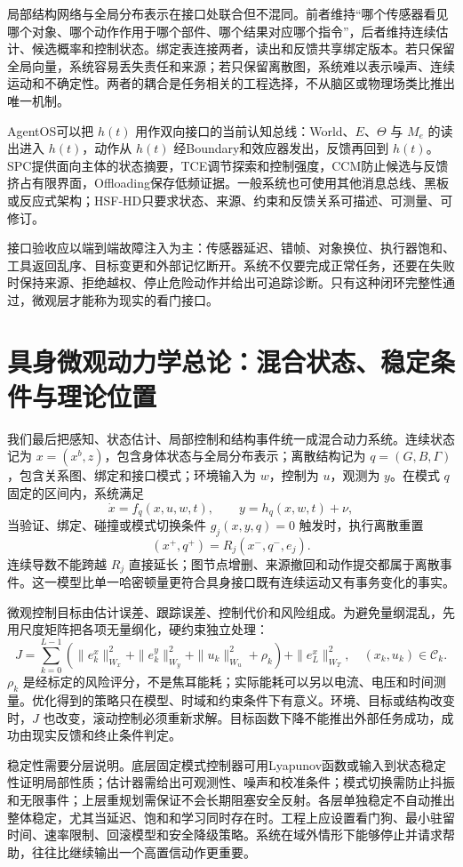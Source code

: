 局部结构网络与全局分布表示在接口处联合但不混同。前者维持“哪个传感器看见哪个对象、哪个动作作用于哪个部件、哪个结果对应哪个指令”，后者维持连续估计、候选概率和控制状态。绑定表连接两者，读出和反馈共享绑定版本。若只保留全局向量，系统容易丢失责任和来源；若只保留离散图，系统难以表示噪声、连续运动和不确定性。两者的耦合是任务相关的工程选择，不从脑区或物理场类比推出唯一机制。

AgentOS可以把 $h(t)$ 用作双向接口的当前认知总线：World、$E$、$\Theta$ 与 $M_e$ 的读出进入 $h(t)$，动作从 $h(t)$ 经Boundary和效应器发出，反馈再回到 $h(t)$。SPC提供面向主体的状态摘要，TCE调节探索和控制强度，CCM防止候选与反馈挤占有限界面，Offloading保存低频证据。一般系统也可使用其他消息总线、黑板或反应式架构；HSF-HD只要求状态、来源、约束和反馈关系可描述、可测量、可修订。

接口验收应以端到端故障注入为主：传感器延迟、错帧、对象换位、执行器饱和、工具返回乱序、目标变更和外部记忆断开。系统不仅要完成正常任务，还要在失败时保持来源、拒绝越权、停止危险动作并给出可追踪诊断。只有这种闭环完整性通过，微观层才能称为现实的看门接口。

\section{具身微观动力学总论：混合状态、稳定条件与理论位置}
\label{sec:section_5750}

我们最后把感知、状态估计、局部控制和结构事件统一成混合动力系统。连续状态记为 $x=(x^b,z)$，包含身体状态与全局分布表示；离散结构记为 $q=(G,B,\Gamma)$，包含关系图、绑定和接口模式；环境输入为 $w$，控制为 $u$，观测为 $y$。在模式 $q$ 固定的区间内，系统满足
\[
\dot x=f_q(x,u,w,t),\qquad y=h_q(x,w,t)+\nu,
\]
当验证、绑定、碰撞或模式切换条件 $g_j(x,y,q)=0$ 触发时，执行离散重置
\[
(x^+,q^+)=R_j(x^-,q^-,e_j).
\]
连续导数不能跨越 $R_j$ 直接延长；图节点增删、来源撤回和动作提交都属于离散事件。这一模型比单一哈密顿量更符合具身接口既有连续运动又有事务变化的事实。

微观控制目标由估计误差、跟踪误差、控制代价和风险组成。为避免量纲混乱，先用尺度矩阵把各项无量纲化，硬约束独立处理：
\[
J=\sum_{k=0}^{L-1}\left(\|e_k^x\|_{W_x}^2+\|e_k^y\|_{W_y}^2+\|u_k\|_{W_u}^2+\rho_k\right)+\|e_L^x\|_{W_T}^2,
\quad (x_k,u_k)\in\mathcal C_k.
\]
$\rho_k$ 是经标定的风险评分，不是焦耳能耗；实际能耗可以另以电流、电压和时间测量。优化得到的策略只在模型、时域和约束条件下有意义。环境、目标或结构改变时，$J$ 也改变，滚动控制必须重新求解。目标函数下降不能推出外部任务成功，成功由现实反馈和终止条件判定。

稳定性需要分层说明。底层固定模式控制器可用Lyapunov函数或输入到状态稳定性证明局部性质；估计器需给出可观测性、噪声和校准条件；模式切换需防止抖振和无限事件；上层重规划需保证不会长期阻塞安全反射。各层单独稳定不自动推出整体稳定，尤其当延迟、饱和和学习同时存在时。工程上应设置看门狗、最小驻留时间、速率限制、回滚模型和安全降级策略。系统在域外情形下能够停止并请求帮助，往往比继续输出一个高置信动作更重要。


